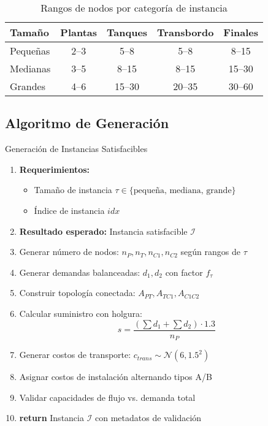 \documentclass[12pt]{article}
\begin{document}
\begin{table}[h]
\centering
\begin{tabular}{@{}lcccc@{}}
\toprule
\textbf{Tamaño} & \textbf{Plantas} & \textbf{Tanques} & \textbf{Transbordo} & \textbf{Finales} \\
\midrule
Pequeñas & 2--3 & 5--8 & 5--8 & 8--15 \\
Medianas & 3--5 & 8--15 & 8--15 & 15--30 \\
Grandes & 4--6 & 15--30 & 20--35 & 30--60 \\
\bottomrule
\end{tabular}
\caption{Rangos de nodos por categoría de instancia}
\end{table}

\subsection{Algoritmo de Generación}

\begin{algorithm}[H]
\caption{Generación de Instancias Satisfacibles}
\begin{enumerate}
    \item \textbf{Requerimientos:}
    \begin{itemize}
        \item Tamaño de instancia $\tau \in \{\text{pequeña, mediana, grande}\}$
        \item Índice de instancia $idx$
    \end{itemize}
    
    \item \textbf{Resultado esperado:} Instancia satisfacible $\mathcal{I}$
    
    \item Generar número de nodos: $n_P, n_T, n_{C1}, n_{C2}$ según rangos de $\tau$
    
    \item Generar demandas balanceadas: $d_1, d_2$ con factor $f_\tau$
    
    \item Construir topología conectada: $A_{PT}, A_{TC1}, A_{C1C2}$
    
    \item Calcular suministro con holgura: 
    \[
    s = \frac{(\sum d_1 + \sum d_2) \cdot 1.3}{n_P}
    \]
    
    \item Generar costos de transporte: $c_{trans} \sim \mathcal{N}(6, 1.5^2)$
    
    \item Asignar costos de instalación alternando tipos A/B
    
    \item Validar capacidades de flujo vs. demanda total
    
    \item \textbf{return} Instancia $\mathcal{I}$ con metadatos de validación
\end{enumerate}
\end{algorithm}
\end{document}
